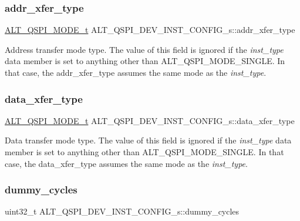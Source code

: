 \subsubsection{\texorpdfstring{addr\_xfer\_type}{addr\_xfer\_type}}
{\footnotesize\ttfamily \mbox{\hyperlink{group__ALT__QSPI__DEV__CFG_ga4d03e307842e1ed33be0039a56ef62c3}{A\+L\+T\+\_\+\+Q\+S\+P\+I\+\_\+\+M\+O\+D\+E\+\_\+t}} A\+L\+T\+\_\+\+Q\+S\+P\+I\+\_\+\+D\+E\+V\+\_\+\+I\+N\+S\+T\+\_\+\+C\+O\+N\+F\+I\+G\+\_\+s\+::addr\+\_\+xfer\+\_\+type}

Address transfer mode type. The value of this field is ignored if the {\itshape inst\+\_\+type} data member is set to anything other than A\+L\+T\+\_\+\+Q\+S\+P\+I\+\_\+\+M\+O\+D\+E\+\_\+\+S\+I\+N\+G\+LE. In that case, the addr\+\_\+xfer\+\_\+type assumes the same mode as the {\itshape inst\+\_\+type}. \mbox{\label{structALT__QSPI__DEV__INST__CONFIG__s_a549bbd189a5e88e4a72bd2e714f37cb0}} 
\subsubsection{\texorpdfstring{data\_xfer\_type}{data\_xfer\_type}}
{\footnotesize\ttfamily \mbox{\hyperlink{group__ALT__QSPI__DEV__CFG_ga4d03e307842e1ed33be0039a56ef62c3}{A\+L\+T\+\_\+\+Q\+S\+P\+I\+\_\+\+M\+O\+D\+E\+\_\+t}} A\+L\+T\+\_\+\+Q\+S\+P\+I\+\_\+\+D\+E\+V\+\_\+\+I\+N\+S\+T\+\_\+\+C\+O\+N\+F\+I\+G\+\_\+s\+::data\+\_\+xfer\+\_\+type}

Data transfer mode type. The value of this field is ignored if the {\itshape inst\+\_\+type} data member is set to anything other than A\+L\+T\+\_\+\+Q\+S\+P\+I\+\_\+\+M\+O\+D\+E\+\_\+\+S\+I\+N\+G\+LE. In that case, the data\+\_\+xfer\+\_\+type assumes the same mode as the {\itshape inst\+\_\+type}. \mbox{\label{structALT__QSPI__DEV__INST__CONFIG__s_aa0525f203a8a92818e9b681df4700b5f}} 
\subsubsection{\texorpdfstring{dummy\_cycles}{dummy\_cycles}}
{\footnotesize\ttfamily uint32\+\_\+t A\+L\+T\+\_\+\+Q\+S\+P\+I\+\_\+\+D\+E\+V\+\_\+\+I\+N\+S\+T\+\_\+\+C\+O\+N\+F\+I\+G\+\_\+s\+::dummy\+\_\+cycles}

